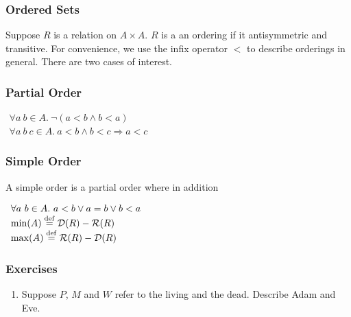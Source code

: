 


\subsubsection{Ordered Sets}

\setcounter{OrderDefinitions}{\value{table}}

Suppose $R$ is a relation on $A\times A$.  
$R$ is a an ordering if it antisymmetric and transitive.  
For convenience, we use the infix operator $<$ to describe orderings in 
general.  There are two cases of interest.

\subsubsection{Partial Order}

$
\begin{array}{l}
\forall a\ b \in A.\ \neg (a < b \wedge b < a)            \\
\forall a\ b\ c \in A.\ a < b \wedge b < c \Rightarrow a < c \end{array} 
$

\subsubsection{Simple Order}

A simple order is a partial order where in addition

$
\begin{array}{l}
\forall a\ b \in A.\ a < b \vee a = b \vee b < a \\
 {\rm min}(A) \stackrel{\rm def}{=} {\cal D}(R) - {\cal R}(R)  \\
 {\rm max}(A) \stackrel{\rm def}{=} {\cal R}(R) - {\cal D}(R) 
\end{array} 
$

\subsubsection{Exercises}
\begin{enumerate}\setcounter{enumi}{\value{RunningExercise}}

\item Suppose $P$, $M$ and $W$ refer to the living and the dead.  
Describe Adam and Eve.

\setcounter{RunningExercise}{\value{enumi}}
\end{enumerate}

